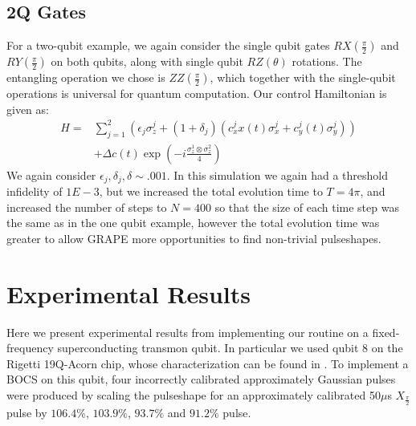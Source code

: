 \documentclass[aps,nofootinbib,pra,notitlepage,twocolumn]{revtex4-1}
\begin{document}



\subsection{2Q Gates}\label{2Q Gates}
 For a two-qubit example, we again consider the single qubit gates $RX(\frac{\pi}{2})$ and $RY(\frac{\pi}{2})$ on both qubits, along with single qubit $RZ(\theta)$ rotations. The entangling operation we chose is $ZZ(\frac{\pi}{2})$, which together with the single-qubit operations is universal for quantum computation. Our control Hamiltonian is given as:
\begin{equation} \label{eq:2Qham}
\begin{split}
H = &\sum_{j=1}^2(\epsilon_j\sigma_z^j + (1 + \delta_j)(c_x^jx(t)\sigma_x^j + c_y^j(t)\sigma_y^j)) \\
&+ \Delta c(t) \exp{(-i\frac{\sigma_z^1\otimes\sigma_z^2}{4})}
\end{split}
\end{equation}
We again consider $\epsilon_j, \delta_j, \delta \sim .001$. In this simulation we again had a threshold infidelity of $1E-3$, but we increased the total evolution time to $T=4\pi$, and increased the number of steps to $N=400$ so that the size of each time step was the same as in the one qubit example, however the total evolution time was greater to allow GRAPE more opportunities to find non-trivial pulseshapes.

\section{Experimental Results}\label{experimental}
Here we present experimental results from implementing our routine on a fixed-frequency superconducting transmon qubit. In particular we used qubit 8 on the Rigetti 19Q-Acorn chip, whose characterization can be found in \cite{1712.05771}. To implement a BOCS on this qubit, four incorrectly calibrated approximately Gaussian pulses were produced by scaling the pulseshape for an approximately calibrated 50$\mu$s $X_{\frac{\pi}{2}}$ pulse by $106.4\%$,  $103.9\%$, $93.7\%$ and $91.2\%$ pulse.
\end{document}
